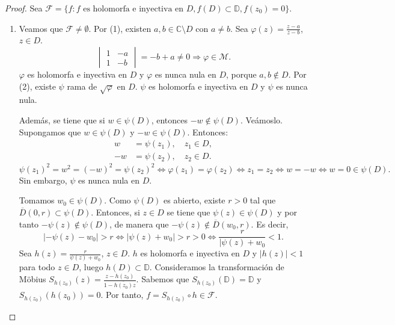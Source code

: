 \begin{proof}
    Sea $\mathcal{F} = \{f : f \text{ es holomorfa e inyectiva en } D, f(D) \subset \mathbb{D}, f(z_0) = 0\}$.
    \begin{enumerate}
        \item Veamos que $\mathcal{F} \neq \emptyset$.
              Por (1), existen $a, b \in \mathbb{C} \setminus D$ con $a \neq b$.
              Sea $\varphi(z) = \frac{z-a}{z-b}$, $z \in D$.
              $$\begin{vmatrix}
                      1 & -a \\
                      1 & -b
                  \end{vmatrix} = -b + a \neq 0 \Rightarrow \varphi \in \mathcal{M}.$$
              $\varphi$ es holomorfa e inyectiva en $D$ y $\varphi$ es nunca nula en $D$, porque $a, b \notin D$.
              Por (2), existe $\psi$ rama de $\sqrt{\varphi}$ en $D$.
              $\psi$ es holomorfa e inyectiva en $D$ y $\psi$ es nunca nula.

              Además, se tiene que si $w \in \psi(D)$, entonces $-w \notin \psi(D)$.
              Veámoslo.
              Supongamos que $w \in \psi(D)$ y $-w \in \psi(D)$.
              Entonces:
              \begin{align*}
                  w  & = \psi(z_1), \quad z_1 \in D, \\
                  -w & = \psi(z_2), \quad z_2 \in D.
              \end{align*}
              $$\psi(z_1)^2 = w^2 = (-w)^2 = \psi(z_2)^2 \Leftrightarrow \varphi(z_1) = \varphi(z_2) \Leftrightarrow z_1 = z_2 \Leftrightarrow w = -w \Leftrightarrow w = 0 \in \psi(D).$$
              Sin embargo, $\psi$ es nunca nula en $D$.

              Tomamos $w_0 \in \psi(D)$.
              Como $\psi(D)$ es abierto, existe $r > 0$ tal que $\overline{D}(0, r) \subset \psi(D)$.
              Entonces, si $z \in D$ se tiene que $\psi(z) \in \psi(D)$ y por tanto $-\psi(z) \notin \psi(D)$, de manera que $-\psi(z) \notin \overline{D}(w_0, r)$.
              Es decir,
              $$|-\psi(z)-w_0| > r \Leftrightarrow |\psi(z)+w_0| > r > 0 \Leftrightarrow \frac{r}{|\psi(z)+w_0} < 1.$$
              Sea $h(z) = \frac{r}{\psi(z)+w_0}$, $z \in D$.
              $h$ es holomorfa e inyectiva en $D$ y $|h(z)| < 1$ para todo $z \in D$, luego $h(D) \subset \mathbb{D}$.
              Consideramos la transformación de Möbius $S_{h(z_0)}(z) = \frac{z-h(z_0)}{1-\overline{h(z_0)}z}$.
              Sabemos que $S_{h(z_0)}(\mathbb{D}) = \mathbb{D}$ y $S_{h(z_0)}(h(z_0)) = 0$.
              Por tanto, $f = S_{h(z_0)} \circ h \in \mathcal{F}$.


\end{enumerate}
\end{proof}
